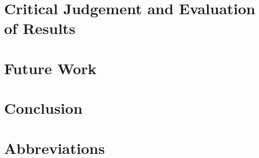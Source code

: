 \documentclass{article}
\begin{document}
\section{Critical Judgement and Evaluation of Results}

\pagebreak

\section{Future Work}

\pagebreak

\section{Conclusion}

\pagebreak

\section{Abbreviations}
\pagebreak

\pagebreak

 
\end{document}
